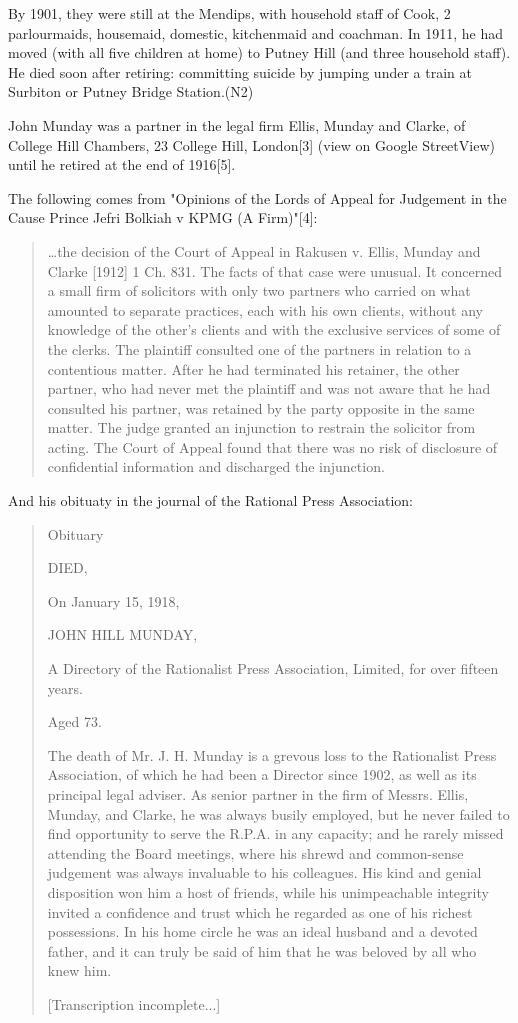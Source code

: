 By 1901, they were still at the Mendips, with household staff of Cook, 2 parlourmaids, housemaid, domestic, kitchenmaid and coachman. In 1911, he had moved (with all five children at home) to Putney Hill (and three household staff). He died soon after retiring: committing suicide by jumping under a train at Surbiton or Putney Bridge Station.(N2)

John Munday was a partner in the legal firm Ellis, Munday and Clarke, of College Hill Chambers, 23 College Hill, London[3] (view on Google StreetView) until he retired at the end of 1916[5].

The following comes from "Opinions of the Lords of Appeal for Judgement in the Cause Prince Jefri Bolkiah v KPMG (A Firm)"[4]:

\begin{quotation}
\dots the decision of the Court of Appeal in Rakusen v. Ellis, Munday and Clarke [1912] 1 Ch. 831. The facts of that case were unusual. It concerned a small firm of solicitors with only two partners who carried on what amounted to separate practices, each with his own clients, without any knowledge of the other's clients and with the exclusive services of some of the clerks. The plaintiff consulted one of the partners in relation to a contentious matter. After he had terminated his retainer, the other partner, who had never met the plaintiff and was not aware that he had consulted his partner, was retained by the party opposite in the same matter. The judge granted an injunction to restrain the solicitor from acting. The Court of Appeal found that there was no risk of disclosure of confidential information and discharged the injunction. 
\end{quotation}

And his obituaty in the journal of the Rational Press Association:

\begin{quotation}
Obituary

DIED,

On January 15, 1918,

JOHN HILL MUNDAY,

A Directory of the Rationalist Press Association, Limited, for over fifteen years.

Aged 73.

The death of Mr. J. H. Munday is a grevous loss to the Rationalist Press Association, of which he had been a Director since 1902, as well as its principal legal adviser. As senior partner in the firm of Messrs. Ellis, Munday, and Clarke, he was always busily employed, but he never failed to find opportunity to serve the R.P.A. in any capacity; and he rarely missed attending the Board meetings, where his shrewd and common-sense judgement was always invaluable to his colleagues. His kind and genial disposition won him a host of friends, while his unimpeachable integrity invited a confidence and trust which he regarded as one of his richest possessions. In his home circle he was an ideal husband and a devoted father, and it can truly be said of him that he was beloved by all who knew him.

[Transcription incomplete...]
\end{quotation}

